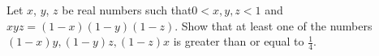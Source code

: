 Let $x$, $y$, $z$ be real numbers such that$ 0 < x,y,z < 1$ and $xyz = (1 - x)(1 - y)(1 - z)$.
Show that at least one of the numbers $(1 - x)y, (1 - y)z, (1 - z)x$ is greater than or equal to $\frac{1}{4}$.
